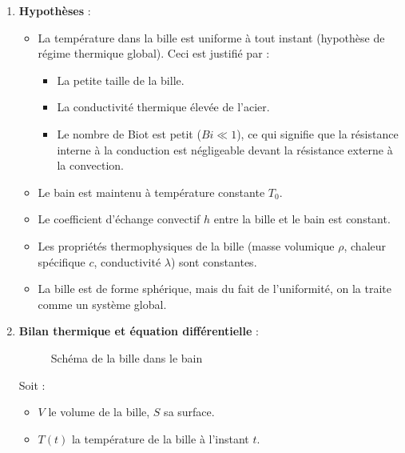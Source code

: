 \documentclass[12pt,a4paper]{article}
\begin{document}
\begin{enumerate}
    \item \textbf{Hypothèses} :
    \begin{itemize}
        \item La température dans la bille est uniforme à tout instant (hypothèse de régime thermique global). Ceci est justifié par :
        \begin{itemize}
            \item La petite taille de la bille.
            \item La conductivité thermique élevée de l'acier.
            \item Le nombre de Biot est petit (\(Bi \ll 1\)), ce qui signifie que la résistance interne à la conduction est négligeable devant la résistance externe à la convection.
        \end{itemize}
        \item Le bain est maintenu à température constante \(T_0\).
        \item Le coefficient d'échange convectif \(h\) entre la bille et le bain est constant.
        \item Les propriétés thermophysiques de la bille (masse volumique \(\rho\), chaleur spécifique \(c\), conductivité \(\lambda\)) sont constantes.
        \item La bille est de forme sphérique, mais du fait de l'uniformité, on la traite comme un système global.
    \end{itemize}

    \item \textbf{Bilan thermique et équation différentielle} :
    
    \begin{figure}[H]
    \centering
    \caption{Schéma de la bille dans le bain}
    \end{figure}
    
    Soit :
    \begin{itemize}
        \item \(V\) le volume de la bille, \(S\) sa surface.
        \item \(T(t)\) la température de la bille à l'instant \(t\).
    \end{itemize}
    

\end{enumerate}
\end{document}

